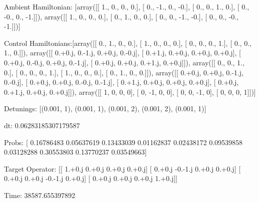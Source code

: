 \documentclass{article}
\begin{document}
    

\newpage

Ambient Hamiltonian: [array([[ 1.,  0.,  0.,  0.],
       [ 0., -1.,  0., -0.],
       [ 0.,  0.,  1.,  0.],
       [ 0., -0.,  0., -1.]]), array([[ 1.,  0.,  0.,  0.],
       [ 0.,  1.,  0.,  0.],
       [ 0.,  0., -1., -0.],
       [ 0.,  0., -0., -1.]])]

Control Hamiltonians:[array([[ 0.,  1.,  0.,  0.],
       [ 1.,  0.,  0.,  0.],
       [ 0.,  0.,  0.,  1.],
       [ 0.,  0.,  1.,  0.]]), array([[ 0.+0.j,  0.-1.j,  0.+0.j,  0.-0.j],
       [ 0.+1.j,  0.+0.j,  0.+0.j,  0.+0.j],
       [ 0.+0.j,  0.-0.j,  0.+0.j,  0.-1.j],
       [ 0.+0.j,  0.+0.j,  0.+1.j,  0.+0.j]]), array([[ 0.,  0.,  1.,  0.],
       [ 0.,  0.,  0.,  1.],
       [ 1.,  0.,  0.,  0.],
       [ 0.,  1.,  0.,  0.]]), array([[ 0.+0.j,  0.+0.j,  0.-1.j,  0.-0.j],
       [ 0.+0.j,  0.+0.j,  0.-0.j,  0.-1.j],
       [ 0.+1.j,  0.+0.j,  0.+0.j,  0.+0.j],
       [ 0.+0.j,  0.+1.j,  0.+0.j,  0.+0.j]]), array([[ 1,  0,  0,  0],
       [ 0, -1,  0,  0],
       [ 0,  0, -1,  0],
       [ 0,  0,  0,  1]])]

Detunings: [(0.001, 1), (0.001, 1), (0.001, 2), (0.001, 2), (0.001, 1)]

 dt: 0.06283185307179587

Probs: [ 0.16786483  0.05637619  0.13433039  0.01162837  0.02438172  0.09539858
  0.03128288  0.30553803  0.13770237  0.03549663]

Target Operator: [[ 1.+0.j  0.+0.j  0.+0.j  0.+0.j]
 [ 0.+0.j -0.-1.j  0.+0.j  0.+0.j]
 [ 0.+0.j  0.+0.j -0.-1.j  0.+0.j]
 [ 0.+0.j  0.+0.j  0.+0.j  1.+0.j]]

Time: 38587.655397892
\end{document}

